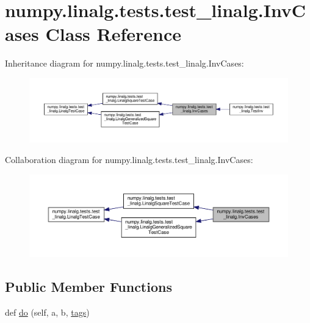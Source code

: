 \hypertarget{classnumpy_1_1linalg_1_1tests_1_1test__linalg_1_1InvCases}{}\section{numpy.\+linalg.\+tests.\+test\+\_\+linalg.\+Inv\+Cases Class Reference}
\label{classnumpy_1_1linalg_1_1tests_1_1test__linalg_1_1InvCases}


Inheritance diagram for numpy.\+linalg.\+tests.\+test\+\_\+linalg.\+Inv\+Cases\+:
\nopagebreak
\begin{figure}[H]
\begin{center}
\leavevmode
\includegraphics[width=350pt]{classnumpy_1_1linalg_1_1tests_1_1test__linalg_1_1InvCases__inherit__graph}
\end{center}
\end{figure}


Collaboration diagram for numpy.\+linalg.\+tests.\+test\+\_\+linalg.\+Inv\+Cases\+:
\nopagebreak
\begin{figure}[H]
\begin{center}
\leavevmode
\includegraphics[width=350pt]{classnumpy_1_1linalg_1_1tests_1_1test__linalg_1_1InvCases__coll__graph}
\end{center}
\end{figure}
\subsection*{Public Member Functions}
\begin{DoxyCompactItemize}
\item 
def \hyperlink{classnumpy_1_1linalg_1_1tests_1_1test__linalg_1_1InvCases_a0f31804f16b2bdb3a13f276c9efcd880}{do} (self, a, b, \hyperlink{namespacenumpy_1_1linalg_1_1tests_1_1test__linalg_ac6a064918e74d701a7b5aac0ffefe1e7}{tags})
\end{DoxyCompactItemize}
